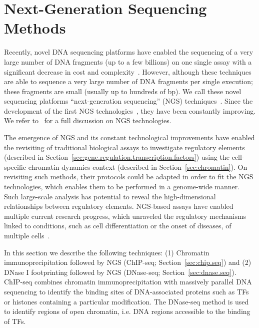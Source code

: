 \section{Next-Generation Sequencing Methods}
\label{sec:ngs.methods}

Recently, novel DNA sequencing platforms have enabled the sequencing of a very large number of DNA fragments (up to a few billions) on one single assay with a significant decrease in cost and complexity~\citep{hayden2014}. However, although these techniques are able to sequence a very large number of DNA fragments per single execution; these fragments are small (usually up to hundreds of bp). We call these novel sequencing platforms ``next-generation sequencing'' (NGS) techniques~\citep{shendure2008}. Since the development of the first NGS technologies~\citep{tucker2009}, they have been constantly improving. We refer to~\cite{rusk2010} for a full discussion on NGS technologies.

The emergence of NGS and its constant technological improvements have enabled the revisiting of traditional biological assays to investigate regulatory elements (described in Section~\ref{sec:gene.regulation.transcription.factors}) using the cell-specific chromatin dynamics context (described in Section~\ref{sec:chromatin}). On revisiting such methods, their protocols could be adapted in order to fit the NGS technologies, which enables them to be performed in a genome-wide manner. Such large-scale analysis has potential to reveal the high-dimensional relationships between regulatory elements. NGS-based assays have enabled multiple current research progress, which unraveled the regulatory mechanisms linked to conditions, such as cell differentiation or the onset of diseases, of multiple cells~\citep{encode2012,neph2012a,thurman2012}.

In this section we describe the following techniques: (1) Chromatin immunoprecipitation followed by NGS (ChIP-seq; Section~\ref{sec:chip.seq}) and (2) DNase I footprinting followed by NGS (DNase-seq; Section~\ref{sec:dnase.seq}). ChIP-seq combines chromatin immunoprecipitation with massively parallel DNA sequencing to identify the binding sites of DNA-associated proteins such as TFs or histones containing a particular modification. The DNase-seq method is used to identify regions of open chromatin, i.e. DNA regions accessible to the binding of TFs.


